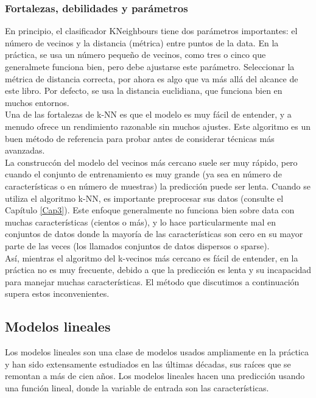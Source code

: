 {\subsubsection{Fortalezas, debilidades y parámetros}


En principio,  el clasificador  {\ttfamily KNeighbours} tiene  dos parámetros importantes: el
número de vecinos y la distancia (métrica) entre puntos de la data. En la práctica,
se usa un  número pequeño de vecinos, como tres o cinco que generalmete funciona bien, pero debe
ajustarse este parámetro. Seleccionar la métrica de distancia correcta, por ahora es algo que va 
más allá del alcance de este libro. Por defecto, se usa la distancia euclidiana, que funciona
bien en muchos entornos.\\


Una de las fortalezas de k-NN es que el modelo es muy fácil de entender, y a menudo
ofrece un rendimiento razonable sin muchos ajustes. Este algoritmo es un buen método de referencia para probar antes de considerar técnicas más avanzadas.\\

 
La construccón del modelo del vecinos más cercano suele ser muy rápido, pero cuando el conjunto de entrenamiento es muy grande (ya sea en número de características o en número de muestras)  la predicción puede ser lenta.  Cuando se utiliza el algoritmo k-NN, es importante preprocesar sus datos (consulte el Capítulo \ref{Cap3}).  Este enfoque generalmente no funciona bien sobre data con muchas características (cientos o más), y lo hace particularmente mal en conjuntos de datos donde la mayoría de las características son cero  en su mayor parte de las veces (los llamados conjuntos de datos dispersos o sparse).\\



Así,  mientras  el algoritmo del k-vecinos más cercano es fácil de entender, en la práctica no es muy frecuente, debido a que la predicción es lenta y su incapacidad para manejar muchas características.
El método que discutimos a continuación supera estos inconvenientes.


\subsection{Modelos lineales}


Los modelos lineales son una clase de modelos usados ampliamente en la práctica y han sido extensamente estudiados  en las últimas décadas, sus raíces que se remontan a más de cien
años. Los modelos lineales hacen una predicción usando una función lineal, donde la variable de entrada son las características. 

}
